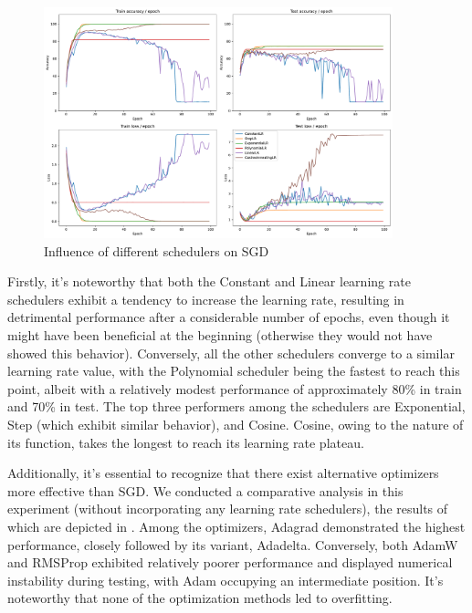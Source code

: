 \begin{figure}[H]
    \centering
    \includegraphics*[width=0.9\textwidth]{figs/CNN/schedulers_influence.pdf}
    \caption{Influence of different schedulers on SGD}
    \label{fig:schedulers_influence}
\end{figure}

Firstly, it's noteworthy that both the Constant and Linear learning rate schedulers exhibit a tendency to increase the learning rate, resulting in detrimental performance after a considerable number of epochs, even though it might have been beneficial at the beginning (otherwise they would not have showed this behavior). Conversely, all the other schedulers converge to a similar learning rate value, with the Polynomial scheduler being the fastest to reach this point, albeit with a relatively modest performance of approximately 80\% in train and 70\% in test. The top three performers among the schedulers are Exponential, Step (which exhibit similar behavior), and Cosine. Cosine, owing to the nature of its function, takes the longest to reach its learning rate plateau.

Additionally, it's essential to recognize that there exist alternative optimizers more effective than SGD. We conducted a comparative analysis in this experiment (without incorporating any learning rate schedulers), the results of which are depicted in . Among the optimizers, Adagrad demonstrated the highest performance, closely followed by its variant, Adadelta. Conversely, both AdamW and RMSProp exhibited relatively poorer performance and displayed numerical instability during testing, with Adam occupying an intermediate position. It's noteworthy that none of the optimization methods led to overfitting.

